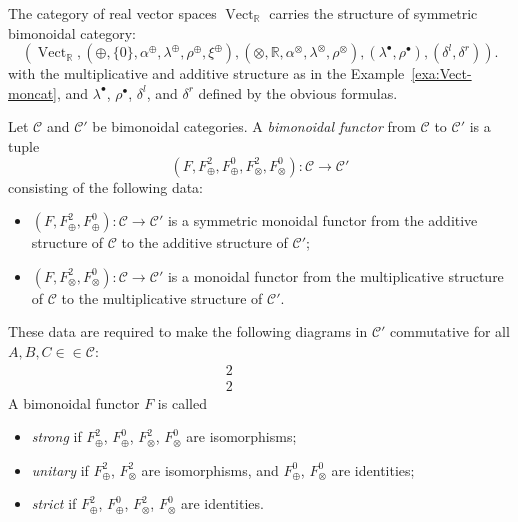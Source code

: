 \documentclass[10pt]{simplearticle}
\newcommand{\tikzinput}[1]{}
\newcommand{\Vect}{\operatorname{Vect}}
\begin{document}
\begin{example}\label{exa:Vect-bimoncat}
The category of real vector spaces $\Vect_{\mathbb{R}}$
carries the structure of symmetric bimonoidal category:
\[
(\Vect_{\mathbb{R}},(\oplus,\{0\},\alpha^{\oplus},\lambda^{\oplus},\rho^{\oplus},\xi^{\oplus}),(\otimes,\mathbb{R},\alpha^{\otimes},\lambda^{\otimes},\rho^{\otimes}),(\lambda^{\bullet},\rho^{\bullet}),(\delta^{l},\delta^{r})).
\]
with the multiplicative and additive structure as in the Example~\ref{exa:Vect-moncat},
and $\lambda^{\bullet}$, $\rho^{\bullet}$, $\delta^{l}$, and $\delta^{r}$
defined by the obvious formulas.
\end{example}

\begin{defn}\label{def:bimon-fun}
 Let $\mathcal{C}$ and $\mathcal{C}'$ be
bimonoidal categories. A \emph{bimonoidal functor} from $\mathcal{C}$
to $\mathcal{C}'$ is a tuple
\[
(F,F^{2}_{\oplus},F^{0}_{\oplus},F^{2}_{\otimes},F^{0}_{\otimes})\colon\mathcal{C}\to\mathcal{C}'
\]
consisting of the following data:
\begin{itemize}
\item $(F,F^{2}_{\oplus},F^{0}_{\oplus})\colon\mathcal{C}\to\mathcal{C}'$
is a symmetric monoidal functor from the additive structure of $\mathcal{C}$
to the additive structure of $\mathcal{C}'$;
\item $(F,F^{2}_{\otimes},F^{0}_{\otimes})\colon\mathcal{C}\to\mathcal{C}'$
is a monoidal functor from the multiplicative structure of $\mathcal{C}$
to the multiplicative structure of $\mathcal{C}'$.
\end{itemize}
These data are required to make the following diagrams in $\mathcal{C}'$
commutative for all $A,B,C\in\in\mathcal{C}$:
\begin{alignat}{2}
 & \tikzinput{d352} & \qquad & \tikzinput{d350}\label{eq:bmf1}
\end{alignat}
\begin{alignat}{2}
 & \tikzinput{d351} & \qquad & \tikzinput{d349}\label{eq:bmf2}
\end{alignat}
A bimonoidal functor $F$ is called
\begin{itemize}
\item \emph{strong} if $F^{2}_{\oplus}$, $F^{0}_{\oplus}$, $F^{2}_{\otimes}$,
$F^{0}_{\otimes}$ are isomorphisms;
\item \emph{unitary} if $F^{2}_{\oplus}$, $F^{2}_{\otimes}$ are isomorphisms,
and $F^{0}_{\oplus}$, $F^{0}_{\otimes}$ are identities;
\item \emph{strict} if $F^{2}_{\oplus}$, $F^{0}_{\oplus}$, $F^{2}_{\otimes}$,
$F^{0}_{\otimes}$ are identities.
\end{itemize}
\end{defn}
\end{document}

